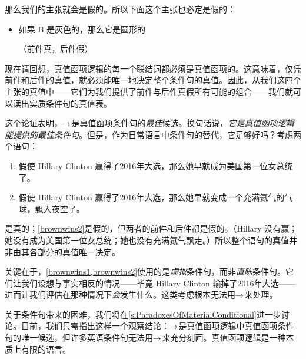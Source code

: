 \begin{center}
\end{center}

那么我们的主张就会是假的。所以下面这个主张也必定是假的：

\begin{itemize}
        \item 如果 B 是灰色的，那么它是圆形的

        \qquad（前件真，后件假）
\end{itemize}

现在请回想，真值函项逻辑的每一个联结词都必须是真值函项的。这意味着，仅凭前件和后件的真值，就必须能唯一地决定整个条件句的真值。因此，从我们这四个主张的真值中——它们为我们提供了前件与后件真假所有可能的组合——我们就可以读出实质条件句的真值表。

这个论证表明，$\rightarrow$是真值函项条件句的\emph{最佳}候选。换句话说，\emph{它是真值函项逻辑能提供的最佳条件句}。但是，作为日常语言中条件句的替代，它足够好吗？考虑两个语句：

\begin{enumerate}
        \item\label{brownwins1} 假使 Hillary Clinton 赢得了2016年大选，那么她早就成为美国第一位女总统了。
        \item\label{brownwins2} 假使 Hillary Clinton 赢得了2016年大选，那么她早就变成一个充满氦气的气球，飘入夜空了。
\end{enumerate}

是真的；\cref*{brownwins2}是假的，但两者的前件和后件都是假的。（Hillary 没有赢；她没有成为美国第一位女总统；她也没有充满氦气飘走。）所以整个语句的真值并非由其各部分的真值唯一决定。

关键在于，\cref*{brownwins1,brownwins2}使用的是\emph{虚拟}条件句，而非\emph{直陈}条件句。它们让我们设想与事实相反的情况——毕竟 Hillary Clinton 输掉了2016年大选——进而让我们评估在那种情况下\emph{会}发生什么。这类考虑根本无法用$\rightarrow$来处理。

关于条件句带来的困难，我们将在\cref{s:ParadoxesOfMaterialConditional}进一步讨论。目前，我们只需指出这样一个观察结论：$\rightarrow$是真值函项逻辑中真值函项条件句的唯一候选，但许多英语条件句无法用$\rightarrow$来充分刻画。真值函项逻辑是一种本质上有限的语言。

